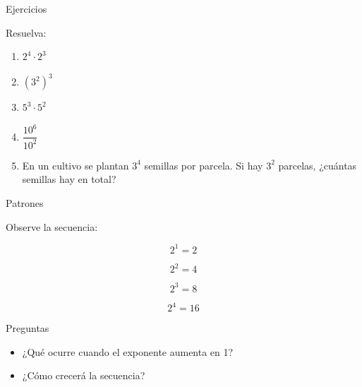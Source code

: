 \documentclass[aspectratio=169,10pt,handout]{beamer}
\begin{document}
	\begin{frame}{Ejercicios}
		
		Resuelva:
		
		\begin{enumerate}
			
			\item \(2^4 \cdot 2^3\)
			
			\item \((3^2)^3\)
			
			\item \(5^3 \cdot 5^2\)
			
			\item \(\dfrac{10^6}{10^2}\)
			
			\item En un cultivo se plantan \(3^4\) semillas por parcela.
			Si hay \(3^2\) parcelas, ¿cuántas semillas hay en total?
			
		\end{enumerate}
		
	\end{frame}
	
	\begin{frame}{Patrones}
		
		Observe la secuencia:
		
		\[
		2^1 = 2
		\]
		
		\[
		2^2 = 4
		\]
		
		\[
		2^3 = 8
		\]
		
		\[
		2^4 = 16
		\]
		
		\begin{block}{Preguntas}
			
			\begin{itemize}
				
				\item ¿Qué ocurre cuando el exponente aumenta en 1?
				
				\item ¿Cómo crecerá la secuencia?
				
			\end{itemize}
			
		\end{block}
		
	\end{frame}
	
\end{document}
